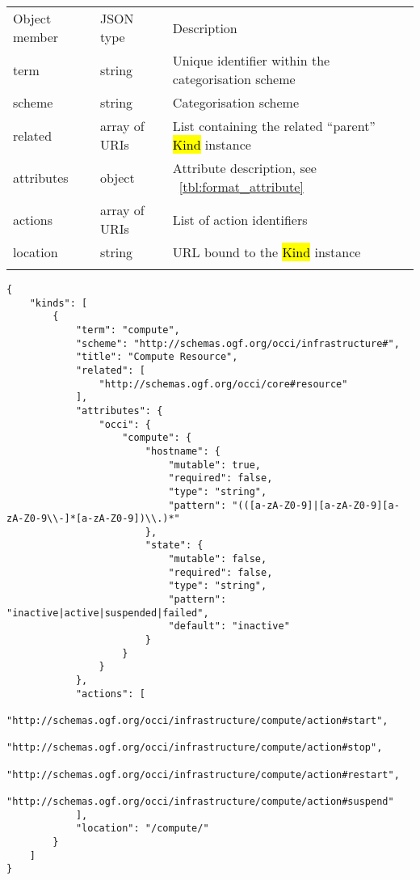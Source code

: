 \documentclass[10pt,a4paper]{article}
\begin{document}
 {
    \begin{tabular}{llll}
    \toprule
    Object member & JSON type & Description \\
    \colrule
    term & string & Unique identifier within the categorisation scheme \\
    scheme & string & Categorisation scheme \\
    related & array of URIs & List containing the related ``parent'' \hl{Kind} instance \\
    attributes & object & Attribute description, see ~\ref{tbl:format_attribute} \\
    actions & array of URIs & List of action identifiers \\
    location & string & URL bound to the \hl{Kind} instance \\
    \botrule
    \end{tabular}
}

\begin{verbatim}
{
    "kinds": [
        {
            "term": "compute",
            "scheme": "http://schemas.ogf.org/occi/infrastructure#",
            "title": "Compute Resource",
            "related": [
                "http://schemas.ogf.org/occi/core#resource"
            ],
            "attributes": {
                "occi": {
                    "compute": {
                        "hostname": {
                            "mutable": true,
                            "required": false,
                            "type": "string",
                            "pattern": "(([a-zA-Z0-9]|[a-zA-Z0-9][a-zA-Z0-9\\-]*[a-zA-Z0-9])\\.)*"
                        },
                        "state": {
                            "mutable": false,
                            "required": false,
                            "type": "string",
                            "pattern": "inactive|active|suspended|failed",
                            "default": "inactive"
                        }
                    }
                }
            },
            "actions": [
                "http://schemas.ogf.org/occi/infrastructure/compute/action#start",
                "http://schemas.ogf.org/occi/infrastructure/compute/action#stop",
                "http://schemas.ogf.org/occi/infrastructure/compute/action#restart",
                "http://schemas.ogf.org/occi/infrastructure/compute/action#suspend"
            ],
            "location": "/compute/"
        }
    ]
}
\end{verbatim}
\end{document}
